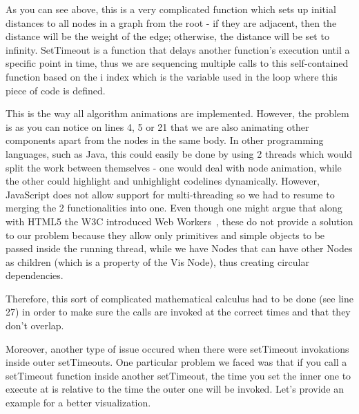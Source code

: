 \documentclass{l4proj}
\begin{document}
As you can see above, this is a very complicated function which sets up initial distances to all nodes in a graph from
the root - if they are adjacent, then the distance will be the weight of the edge; otherwise, the distance will be set
to infinity. SetTimeout is a function that delays another function's execution until a specific point in time, thus we are sequencing
multiple calls to this self-contained function based on the i index which is the variable used in the loop where
this piece of code is defined. 

This is the way all algorithm animations are implemented. However, the problem is as you can notice on lines 4, 5 or 21
that we are also animating other components apart from the nodes in the same body. In other programming languages, such as Java, this
could easily be done by using 2 threads which would split the work between themselves - one would deal with node
animation, while the other could highlight and unhighlight codelines dynamically. However, JavaScript does not allow
support for multi-threading so we had to resume to merging the 2 functionalities into one. Even though one might argue
that along with HTML5 the W3C introduced Web Workers~\cite{web-worker}, these do not provide a solution to our problem
because they allow only primitives and simple objects to be passed inside the running thread, while we have Nodes that
can have other Nodes as children (which is a property of the Vis Node), thus creating circular dependencies.

Therefore, this sort of complicated mathematical calculus had to be done (see line 27) in order to make sure the calls are invoked at
the correct times and that they don't overlap. 

Moreover, another type of issue occured when there were setTimeout invokations inside outer setTimeouts. One particular
problem we faced was that if you call a setTimeout function inside another setTimeout, the time you set the inner one
to execute at is relative to the time the outer one will be invoked. Let's provide an example for a better
visualization.
\end{document}
